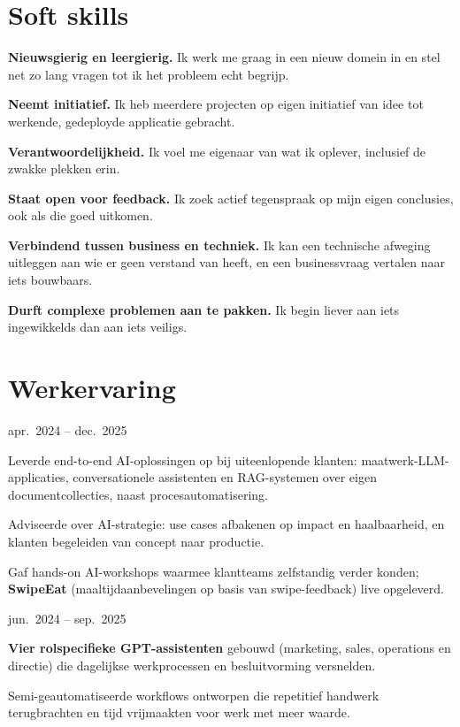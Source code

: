\documentclass[10pt]{article}
\newcommand{\entry}[2]{\vspace{2pt}{\bfseries #1}\hfill{\small\color{gray}#2}\par}
\begin{document}
\section*{Soft skills}
\vspace{1pt}
\begin{tights}
  \item \textbf{Nieuwsgierig en leergierig.} Ik werk me graag in een nieuw domein in en stel net zo lang vragen tot ik het probleem echt begrijp.
  \item \textbf{Neemt initiatief.} Ik heb meerdere projecten op eigen initiatief van idee tot werkende, gedeployde applicatie gebracht.
  \item \textbf{Verantwoordelijkheid.} Ik voel me eigenaar van wat ik oplever, inclusief de zwakke plekken erin.
  \item \textbf{Staat open voor feedback.} Ik zoek actief tegenspraak op mijn eigen conclusies, ook als die goed uitkomen.
  \item \textbf{Verbindend tussen business en techniek.} Ik kan een technische afweging uitleggen aan wie er geen verstand van heeft, en een businessvraag vertalen naar iets bouwbaars.
  \item \textbf{Durft complexe problemen aan te pakken.} Ik begin liever aan iets ingewikkelds dan aan iets veiligs.
\end{tights}

\section*{Werkervaring}
\entry{AI-consultant \,\textbar\, Vervai}{apr.\ 2024 -- dec.\ 2025}
\begin{tights}
  \item Leverde end-to-end AI-oplossingen op bij uiteenlopende klanten: maatwerk-LLM-applicaties, conversationele assistenten en RAG-systemen over eigen documentcollecties, naast procesautomatisering.
  \item Adviseerde over AI-strategie: use cases afbakenen op impact en haalbaarheid, en klanten begeleiden van concept naar productie.
  \item Gaf hands-on AI-workshops waarmee klantteams zelfstandig verder konden; \textbf{SwipeEat} (maaltijdaanbevelingen op basis van swipe-feedback) live opgeleverd.
\end{tights}
\entry{Innovatieconsultant \,\textbar\, Daffee}{jun.\ 2024 -- sep.\ 2025}
\begin{tights}
  \item \textbf{Vier rolspecifieke GPT-assistenten} gebouwd (marketing, sales, operations en directie) die dagelijkse werkprocessen en besluitvorming versnelden.
  \item Semi-geautomatiseerde workflows ontworpen die repetitief handwerk terugbrachten en tijd vrijmaakten voor werk met meer waarde.
\end{tights}
\end{document}
